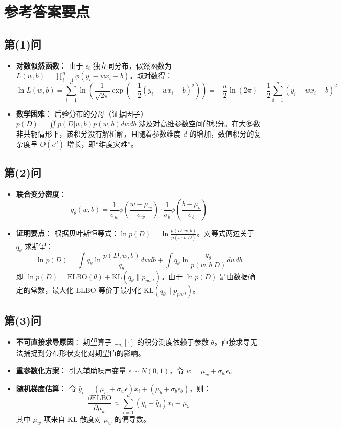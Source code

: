 \documentclass[11pt,a4paper]{article}
\begin{document}
\newpage

\section*{参考答案要点}

\subsection*{第(1)问}
\begin{itemize}
    \item \textbf{对数似然函数}：
    由于 $\epsilon_i$ 独立同分布，似然函数为 $L(w, b) = \prod_{i=1}^n \phi(y_i - wx_i - b)$。取对数得：
    \[ \ln L(w, b) = \sum_{i=1}^n \ln \left( \frac{1}{\sqrt{2\pi}} \exp\left( -\frac{1}{2}(y_i - wx_i - b)^2 \right) \right) = -\frac{n}{2}\ln(2\pi) - \frac{1}{2}\sum_{i=1}^n (y_i - wx_i - b)^2 \]
    \item \textbf{数学困难}：
    后验分布的分母（证据因子）$p(D) = \iint p(D|w,b)p(w,b) dwdb$ 涉及对高维参数空间的积分。在大多数非共轭情形下，该积分没有解析解，且随着参数维度 $d$ 的增加，数值积分的复杂度呈 $O(e^d)$ 增长，即“维度灾难”。
\end{itemize}

\subsection*{第(2)问}
\begin{itemize}
    \item \textbf{联合变分密度}：
    \[ q_\theta(w, b) = \frac{1}{\sigma_w}\phi\left(\frac{w-\mu_w}{\sigma_w}\right) \cdot \frac{1}{\sigma_b}\phi\left(\frac{b-\mu_b}{\sigma_b}\right) \]
    \item \textbf{证明要点}：
    根据贝叶斯恒等式：$\ln p(D) = \ln \frac{p(D, w, b)}{p(w, b|D)}$。对等式两边关于 $q_\theta$ 求期望：
    \[ \ln p(D) = \int q_\theta \ln \frac{p(D, w, b)}{q_\theta} dwdb + \int q_\theta \ln \frac{q_\theta}{p(w, b|D)} dwdb \]
    即 $\ln p(D) = \text{ELBO}(\theta) + \text{KL}(q_\theta \parallel p_{post})$。由于 $\ln p(D)$ 是由数据确定的常数，最大化 $\text{ELBO}$ 等价于最小化 $\text{KL}(q_\theta \parallel p_{post})$。
\end{itemize}

\subsection*{第(3)问}
\begin{itemize}
    \item \textbf{不可直接求导原因}：
    期望算子 $\mathbb{E}_{q_\theta}[\cdot]$ 的积分测度依赖于参数 $\theta$。直接求导无法捕捉到分布形状变化对期望值的影响。
    \item \textbf{重参数化方案}：
    引入辅助噪声变量 $\epsilon \sim N(0, 1)$，令 $w = \mu_w + \sigma_w \epsilon$。
    \item \textbf{随机梯度估算}：
    令 $\hat{y}_i = (\mu_w + \sigma_w \epsilon)x_i + (\mu_b + \sigma_b \epsilon_b)$，则：
    \[ \frac{\partial \text{ELBO}}{\partial \mu_w} \approx \sum_{i=1}^n (y_i - \hat{y}_i)x_i - \mu_w \]
    其中 $\mu_w$ 项来自 $\text{KL}$ 散度对 $\mu_w$ 的偏导数。
\end{itemize}
\end{document}
